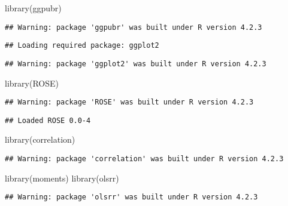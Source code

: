 \documentclass[
]{article}
\newenvironment{Shaded}{\begin{snugshade}}{\end{snugshade}}
\newcommand{\FunctionTok}[1]{\textcolor[rgb]{0.00,0.00,0.00}{#1}}
\newcommand{\NormalTok}[1]{#1}
\begin{document}
\begin{Shaded}
\begin{Highlighting}[]
\FunctionTok{library}\NormalTok{(ggpubr)}
\end{Highlighting}
\end{Shaded}

\begin{verbatim}
## Warning: package 'ggpubr' was built under R version 4.2.3
\end{verbatim}

\begin{verbatim}
## Loading required package: ggplot2
\end{verbatim}

\begin{verbatim}
## Warning: package 'ggplot2' was built under R version 4.2.3
\end{verbatim}

\begin{Shaded}
\begin{Highlighting}[]
\FunctionTok{library}\NormalTok{(ROSE)}
\end{Highlighting}
\end{Shaded}

\begin{verbatim}
## Warning: package 'ROSE' was built under R version 4.2.3
\end{verbatim}

\begin{verbatim}
## Loaded ROSE 0.0-4
\end{verbatim}

\begin{Shaded}
\begin{Highlighting}[]
\FunctionTok{library}\NormalTok{(correlation)}
\end{Highlighting}
\end{Shaded}

\begin{verbatim}
## Warning: package 'correlation' was built under R version 4.2.3
\end{verbatim}

\begin{Shaded}
\begin{Highlighting}[]
\FunctionTok{library}\NormalTok{(moments) }
\FunctionTok{library}\NormalTok{(olsrr) }
\end{Highlighting}
\end{Shaded}

\begin{verbatim}
## Warning: package 'olsrr' was built under R version 4.2.3
\end{verbatim}
\end{document}
